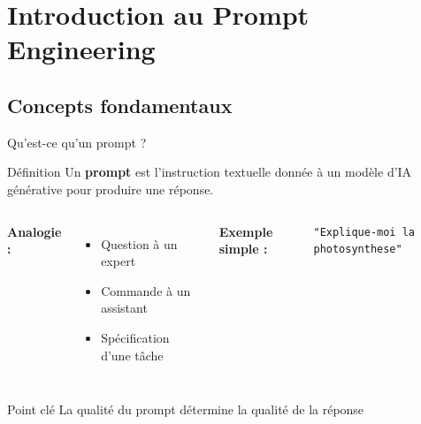
\section{Introduction au Prompt Engineering}
\subsection{Concepts fondamentaux}

\begin{frame}[fragile]{Qu'est-ce qu'un prompt ?}
\begin{block}{Définition}
Un \textbf{prompt} est l'instruction textuelle donnée à un modèle d'IA générative pour produire une réponse.
\end{block}

\vspace{0.5cm}

\begin{columns}
\textbf{Analogie :}
\begin{itemize}
    \item Question à un expert
    \item Commande à un assistant
    \item Spécification d'une tâche
\end{itemize}

\textbf{Exemple simple :}
\begin{lstlisting}
"Explique-moi la photosynthese"
\end{lstlisting}
\end{columns}

\vspace{0.3cm}
\begin{alertblock}{Point clé}
La qualité du prompt détermine la qualité de la réponse
\end{alertblock}
\end{frame}

